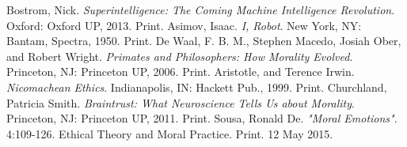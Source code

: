 \documentclass[11pt, oneside]{article}
\begin{document}
\begin{thebibliography}{9}
  Bostrom, Nick. 
  \emph{Superintelligence: The Coming Machine Intelligence Revolution}.
  Oxford: Oxford UP, 2013.
  Print.
  Asimov, Isaac.
  \emph{I, Robot}.
  New York, NY: Bantam, Spectra, 1950.
  Print.
  De Waal, F. B. M., Stephen Macedo, Josiah Ober, and Robert Wright.
  \emph{Primates and Philosophers: How Morality Evolved}.
  Princeton, NJ: Princeton UP, 2006.
  Print.
  Aristotle, and Terence Irwin.
  \emph{Nicomachean Ethics}.
  Indianapolis, IN: Hackett Pub., 1999.
  Print.
  Churchland, Patricia Smith.
  \emph{Braintrust: What Neuroscience Tells Us about Morality}.
  Princeton, NJ: Princeton UP, 2011. 
  Print.
  Sousa, Ronald De. 
  \emph{"Moral Emotions"}. 
  4:109-126. Ethical Theory and Moral Practice.
  Print. 12 May 2015.
\end{thebibliography}
\end{document}
